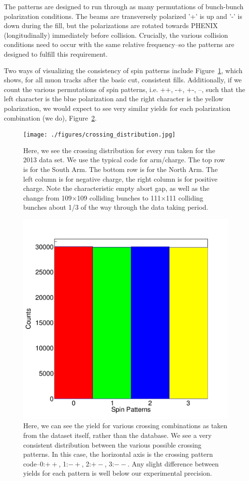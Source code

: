 The patterns are designed to run through as many permutations of bunch-bunch
polarization conditions. The beams are transversely polarized '+' is up and '-'
is down during the fill, but the polarizations are rotated towards PHENIX
(longitudinally) immediately before collision. Crucially, the various collision
conditions need to occur with the same relative frequency--so the patterns are
designed to fulfill this requirement.

Two ways of visualizing the consistency of spin patterns include
Figure~\ref{fig:crossing_count}, which shows, for all muon tracks after the
basic cut, consistent fills. Additionally, if we count the various permutations
of spin patterns, i.e. ++, -+, +-, --, such that the left character is the blue
polarization and the right character is the yellow polarization, we would expect
to see very similar yields for each polarization combination (we do),
Figure~\ref{fig:polarization_counts}.

\begin{figure}
  \centering
  \texttt{[image: ./figures/crossing\_distribution.jpg]}
  \caption{
    Here, we see the crossing distribution for every run taken for the 2013 data
    set. We use the typical code for arm/charge. The top row is for the South
    Arm. The bottom row is for the North Arm. The left column is for negative
    charge, the right column is for positive charge. Note the characteristic
    empty abort gap, as well as the change from 109$\times$109 colliding bunches
    to 111$\times$111 colliding bunches about 1/3 of the way through the data
    taking period.
  }
  \label{fig:crossing_count}
\end{figure}

\begin{figure}
  \centering
  \includegraphics[width=0.6\linewidth]{./figures/crossing_pattenr_count.jpg}
  \caption{
    Here, we can see the yield for various crossing combinations as taken from
    the dataset itself, rather than the database. We see a very consistent
    distribution between the various possible crossing patterns. In this case,
    the horizontal axis is the crossing pattern code--0:$++$, 1:$-+$, 2:$+-$,
    3:$--$. Any slight difference between yields for each pattern is well below
    our experimental precision.
  }
  \label{fig:polarization_counts}
\end{figure}

